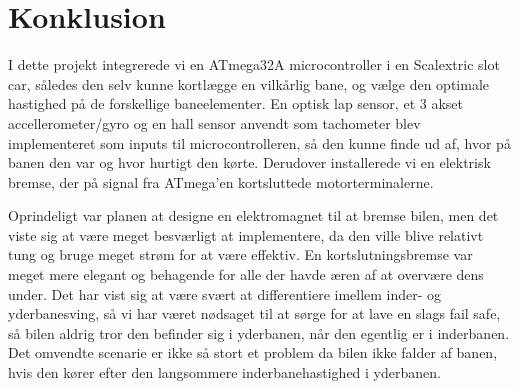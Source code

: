 \section{Konklusion}

I dette projekt integrerede vi en ATmega32A microcontroller i en Scalextric slot car, således den selv kunne kortlægge en vilkårlig bane, og vælge den optimale hastighed på de forskellige baneelementer. En optisk lap sensor, et 3 akset accellerometer/gyro og en hall sensor anvendt som tachometer blev implementeret som inputs til microcontrolleren, så den kunne finde ud af, hvor på banen den var og hvor hurtigt den kørte. Derudover installerede vi en elektrisk bremse, der på signal fra ATmega'en kortsluttede motorterminalerne. \par
Oprindeligt var planen at designe en elektromagnet til at bremse bilen, men det viste sig at være meget besværligt at implementere, da den ville blive relativt tung og bruge meget strøm for at være effektiv. En kortslutningsbremse var meget mere elegant og behagende for alle der havde æren af at overvære dens under. Det har vist sig at være svært at differentiere imellem inder- og yderbanesving, så vi har været nødsaget til at sørge for at lave en slags fail safe, så bilen aldrig tror den befinder sig i yderbanen, når den egentlig er i inderbanen. Det omvendte scenarie er ikke så stort et problem da bilen ikke falder af banen, hvis den kører efter den langsommere inderbanehastighed i yderbanen.